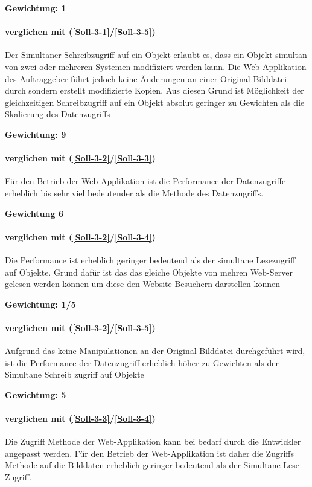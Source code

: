 \textbf{Gewichtung: 1}


\paragraph*{ verglichen mit  (\ref{Soll-3-1}/\ref{Soll-3-5})}
Der Simultaner Schreibzugriff auf ein Objekt erlaubt es, dass ein Objekt simultan von zwei oder mehreren Systemen modifiziert werden kann. Die Web-Applikation des Auftraggeber führt jedoch keine Änderungen an einer Original Bilddatei durch sondern erstellt modifizierte Kopien. Aus diesen Grund ist Möglichkeit der gleichzeitigen Schreibzugriff auf ein Objekt absolut geringer zu Gewichten als die Skalierung des Datenzugriffs

\textbf{Gewichtung: 9}

\paragraph*{ verglichen mit  (\ref{Soll-3-2}/\ref{Soll-3-3})}
Für den Betrieb der Web-Applikation ist die Performance der Datenzugriffe erheblich bis sehr viel bedeutender als die Methode des Datenzugriffs.

\textbf{Gewichtung 6}

\paragraph*{ verglichen mit  (\ref{Soll-3-2}/\ref{Soll-3-4})}
Die Performance ist erheblich geringer bedeutend als der simultane Lesezugriff auf Objekte. Grund dafür ist das das gleiche Objekte von mehren Web-Server gelesen werden können um diese den Website Besuchern darstellen können 

\textbf{Gewichtung: 1/5}

\paragraph*{ verglichen mit  (\ref{Soll-3-2}/\ref{Soll-3-5})}
Aufgrund das keine Manipulationen an der Original Bilddatei durchgeführt wird, ist die Performance der Datenzugriff erheblich höher zu Gewichten als der Simultane Schreib zugriff auf Objekte 

\textbf{Gewichtung: 5}


\paragraph*{ verglichen mit  (\ref{Soll-3-3}/\ref{Soll-3-4})}
Die Zugriff Methode der Web-Applikation kann bei bedarf durch die Entwickler angepasst werden. Für den Betrieb der Web-Applikation ist daher die Zugriffs Methode auf die Bilddaten erheblich geringer bedeutend als der Simultane Lese Zugriff.

